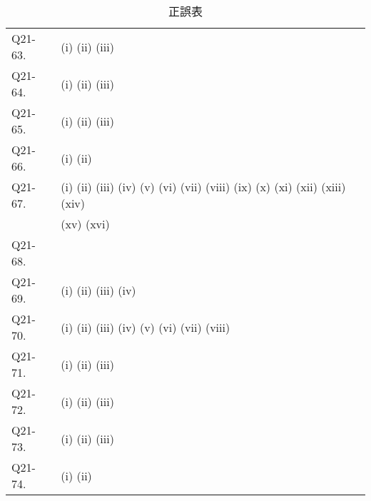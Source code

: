 \documentclass[uplatex,dvipdfmx,a4paper,11pt]{jlreq}
\numberwithin{equation}{section}
\theoremstyle{definition}
\begin{document}
\begin{table}[hbtp]
\begin{tabular}{ll}
    Q21-63. & (i) \quad (ii) \quad (iii) \quad                                                                                                                               \\
    Q21-64. & (i) \quad (ii) \quad (iii) \quad                                                                                                                               \\
    Q21-65. & (i) \quad (ii) \quad (iii) \quad                                                                                                                               \\
    Q21-66. & (i) \quad (ii) \quad                                                                                                                                           \\
    Q21-67. & (i) \quad (ii) \quad (iii) \quad (iv) \quad (v) \quad (vi) \quad (vii) \quad (viii) \quad (ix) \quad (x) \quad (xi) \quad (xii) \quad (xiii) \quad (xiv) \quad \\
            & (xv) \quad (xvi) \quad                                                                                                                                         \\
    Q21-68. & \quad                                                                                                                                                          \\
    Q21-69. & (i) \quad (ii) \quad (iii) \quad (iv) \quad                                                                                                                    \\
    Q21-70. & (i) \quad (ii) \quad (iii) \quad (iv) \quad (v) \quad (vi) \quad (vii) \quad (viii) \quad                                                                      \\
    Q21-71. & (i) \quad (ii) \quad (iii) \quad                                                                                                                               \\
    Q21-72. & (i) \quad (ii) \quad (iii) \quad                                                                                                                               \\
    Q21-73. & (i) \quad (ii) \quad (iii) \quad                                                                                                                               \\
    Q21-74. & (i) \quad (ii) \quad                                                                                                                                           \\
    \hline
  \end{tabular}
  \caption{正誤表}
\end{table}
\end{document}
